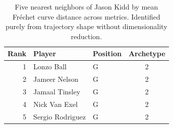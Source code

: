 \begin{table}[htbp]
  \centering\small
  \begin{tabular}{rllc}
    \toprule
    Rank & Player & Position & Archetype \\
    \midrule
    1 & Lonzo Ball & G & 2 \\
    2 & Jameer Nelson & G & 2 \\
    3 & Jamaal Tinsley & G & 2 \\
    4 & Nick Van Exel & G & 2 \\
    5 & Sergio Rodriguez & G & 2 \\
    \bottomrule
  \end{tabular}
  \caption{Five nearest neighbors of Jason Kidd by mean Fr\'{e}chet curve distance across metrics. Identified purely from trajectory shape without dimensionality reduction.}
  \label{tab:Jason_Kidd_frechet_curve_neighbors}
\end{table}

